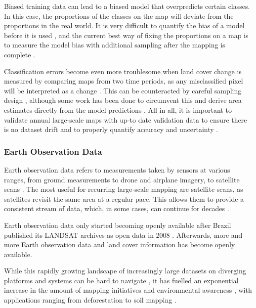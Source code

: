         Biased training data can lead to a biased model that overpredicts certain classes. In this case, the proportions of the classes on the map will deviate from the proportions in the real world. It is very difficult to quantify the bias of a model before it is used \citep{stehman2013estimating}, and the current best way of fixing the proportions on a map is to measure the model bias with additional sampling after the mapping is complete \citep{stehman2014estimating}.

        Classification errors become even more troublesome when land cover change is measured by comparing maps from two time periods, as any misclassified pixel will be interpreted as a change \citep{olofsson2013making}. This can be counteracted by careful sampling design \citep{stehman2012impact,olofsson2014good}, although some work has been done to circumvent this and derive area estimates directly from the model predictions \citep{sales2022land,kleinewillinghofer2022unbiased,angelopoulos2023predictionpowered}.
        All in all, it is important to validate annual large-scale maps with up-to date validation data to ensure there is no dataset drift and to properly quantify accuracy and uncertainty \citep{tsendbazar2021towards}.

    \subsubsection{Earth Observation Data}

        Earth observation data refers to measurements taken by sensors at various ranges, from ground measurements \citep{shahi2015novel} to drone \citep{tang2015drone} and airplane \citep{mastelic2020aerial} imagery, to satellite scans \citep{phiri2020sentinel}. The most useful for recurring large-scale mapping are satellite scans, as satellites revisit the same area at a regular pace. This allows them to provide a consistent stream of data, which, in some cases, can continue for decades \citep{xiong2020modis,wulder2022fifty}.

        Earth observation data only started becoming openly available after Brazil published its LANDSAT archives as open data in 2008 \citep{nature2008markets}. Afterwards, more and more Earth observation data and land cover information has become openly available. 
    
        While this rapidly growing landscape of increasingly large datasets on diverging platforms and systems can be hard to navigate \citep{wagemann2021a}, it has fuelled an exponential increase in the amount of mapping initiatives and environmental awareness \citep{wulder2022fifty}, with applications ranging from deforestation \citep{hansen2013high} to soil mapping \citep{hengl2017soilgrids250m}.
        
